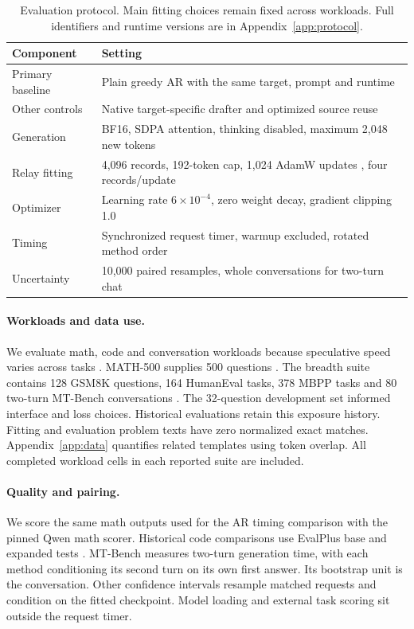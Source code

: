 \documentclass{article}
\begin{document}
\begin{table}[H]
\caption{Evaluation protocol. Main fitting choices remain fixed across
workloads. Full identifiers and runtime versions are in Appendix~\ref{app:protocol}.}
\label{tab:setup}
\centering\small
\begin{tabular}{p{.23\linewidth}p{.70\linewidth}}
\toprule
Component & Setting \\
\midrule
Primary baseline & Plain greedy AR with the same target, prompt and runtime \\
Other controls & Native target-specific drafter and optimized source reuse \\
Generation & BF16, SDPA attention, thinking disabled, maximum 2,048 new tokens \\
Relay fitting & 4,096 records, 192-token cap, 1,024 AdamW updates \citep{loshchilov2019adamw}, four records/update \\
Optimizer & Learning rate $6\times10^{-4}$, zero weight decay, gradient clipping 1.0 \\
Timing & Synchronized request timer, warmup excluded, rotated method order \\
Uncertainty & 10,000 paired resamples, whole conversations for two-turn chat \\
\bottomrule
\end{tabular}
\end{table}

\paragraph{Workloads and data use.}
We evaluate math, code and conversation workloads because speculative
speed varies across tasks \citep{xia2024specbench,abramovich2026speedbench}.
MATH-500 supplies 500 questions \citep{lightman2023verify}. The breadth suite contains 128 GSM8K
questions, 164 HumanEval tasks, 378 MBPP tasks and 80 two-turn MT-Bench
conversations \citep{hendrycks2021math,cobbe2021gsm8k,chen2021humaneval,austin2021mbpp,zheng2023mtbench}.
The 32-question development set informed interface and loss choices.
Historical evaluations retain this exposure history. Fitting and evaluation
problem texts have zero normalized exact matches. Appendix~\ref{app:data}
quantifies related templates using token overlap. All completed workload
cells in each reported suite are included.

\paragraph{Quality and pairing.}
We score the same math outputs used for the AR timing comparison with the
pinned Qwen math scorer. Historical code comparisons use EvalPlus base
and expanded tests \citep{liu2023evalplus}. MT-Bench measures two-turn
generation time, with each method conditioning its second turn on its own
first answer. Its bootstrap unit is the conversation. Other confidence
intervals resample matched requests and condition on the fitted checkpoint.
Model loading and external task scoring sit outside the request timer.
\end{document}
